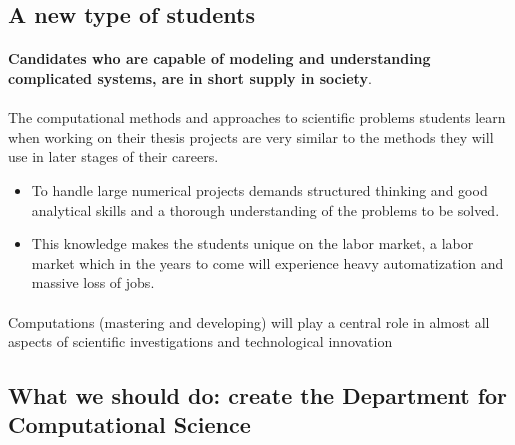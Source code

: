 \documentclass[%
oneside,                 %
final,                   %
10pt]{article}
\begin{document}
\subsection*{A new type of students}

\paragraph{}
\textbf{Candidates who are capable of modeling and understanding complicated
systems, are in short supply in society}.



\paragraph{}
The computational methods and approaches to scientific problems students learn
when working on their thesis projects are very similar to the methods
they will use in later stages of their careers.  
\begin{itemize}
\item To handle large numerical projects demands structured thinking and good analytical skills and a thorough understanding of the problems to be solved. 

\item This knowledge makes the students unique on the labor market, a labor market which in the years to come will experience heavy automatization and massive loss of jobs.
\end{itemize}

\noindent




\paragraph{}
Computations (mastering and developing)  will play a central role in almost all aspects of scientific investigations and technological innovation





\subsection*{What we should do: create the Department  for Computational Science}
\end{document}
